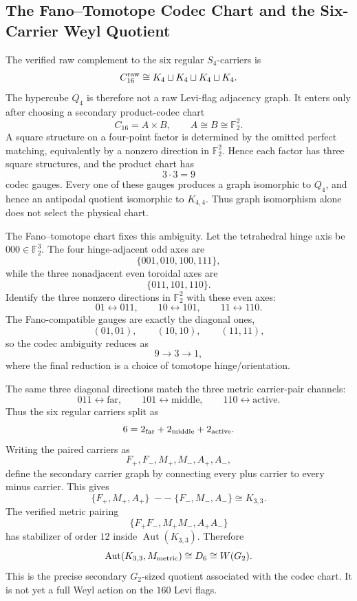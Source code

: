 \subsection{The Fano--Tomotope Codec Chart and the Six-Carrier Weyl Quotient}

The verified raw complement to the six regular \(S_4\)-carriers is
\[
C_{16}^{\rm raw}\cong K_4\sqcup K_4\sqcup K_4\sqcup K_4.
\]
The hypercube \(Q_4\) is therefore not a raw Levi-flag adjacency graph.  It enters only after choosing a secondary product-codec chart
\[
C_{16}=A\times B,
\qquad A\cong B\cong\mathbb F_2^2.
\]
A square structure on a four-point factor is determined by the omitted perfect matching, equivalently by a nonzero direction in \(\mathbb F_2^2\).  Hence each factor has three square structures, and the product chart has
\[
3\cdot3=9
\]
codec gauges.  Every one of these gauges produces a graph isomorphic to \(Q_4\), and hence an antipodal quotient isomorphic to \(K_{4,4}\).  Thus graph isomorphism alone does not select the physical chart.

The Fano--tomotope chart fixes this ambiguity.  Let the tetrahedral hinge axis be \(000\in\mathbb F_2^3\).  The four hinge-adjacent odd axes are
\[
\{001,010,100,111\},
\]
while the three nonadjacent even toroidal axes are
\[
\{011,101,110\}.
\]
Identify the three nonzero directions in \(\mathbb F_2^2\) with these even axes:
\[
01\leftrightarrow011,\qquad
10\leftrightarrow101,\qquad
11\leftrightarrow110.
\]
The Fano-compatible gauges are exactly the diagonal ones,
\[
(01,01),\qquad(10,10),\qquad(11,11),
\]
so the codec ambiguity reduces as
\[
\boxed{9\longrightarrow3\longrightarrow1,}
\]
where the final reduction is a choice of tomotope hinge/orientation.

The same three diagonal directions match the three metric carrier-pair channels:
\[
011\leftrightarrow\mathrm{far},\qquad
101\leftrightarrow\mathrm{middle},\qquad
110\leftrightarrow\mathrm{active}.
\]
Thus the six regular carriers split as
\[
6=2_{\rm far}+2_{\rm middle}+2_{\rm active}.
\]
Writing the paired carriers as
\[
F_+,F_-,M_+,M_-,A_+,A_-,
\]
define the secondary carrier graph by connecting every plus carrier to every minus carrier.  This gives
\[
\{F_+,M_+,A_+\}\;--\;\{F_-,M_-,A_-\}\cong K_{3,3}.
\]
The verified metric pairing
\[
\{F_+F_-,M_+M_-,A_+A_-\}
\]
has stabilizer of order \(12\) inside \(\operatorname{Aut}(K_{3,3})\).  Therefore
\[
\operatorname{Aut}(K_{3,3},M_{\rm metric})\cong D_6\cong W(G_2).
\]
This is the precise secondary \(G_2\)-sized quotient associated with the codec chart.  It is not yet a full Weyl action on the \(160\) Levi flags.
